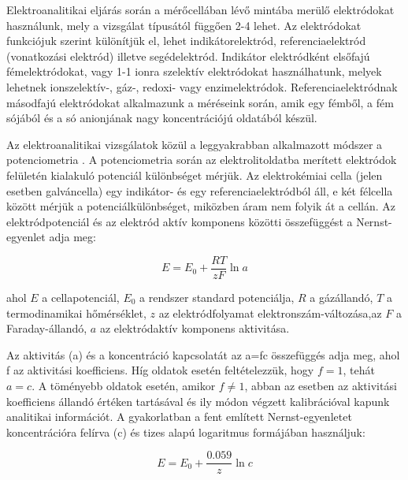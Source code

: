 Elektroanalitikai eljárás során a mérőcellában lévő mintába merülő elektródokat használunk, mely a vizsgálat típusától függően 2-4 lehet. Az elektródokat funkciójuk szerint különítjük el, lehet indikátorelektród, referenciaelektród (vonatkozási elektród) illetve segédelektród. Indikátor elektródként elsőfajú fémelektródokat, vagy 1-1 ionra szelektív elektródokat használhatunk, melyek lehetnek ionszelektív-, gáz-, redoxi- vagy enzimelektródok. Referenciaelektródnak másodfajú elektródokat alkalmazunk a méréseink során, amik egy fémből, a fém sójából és a só anionjának nagy koncentrációjú oldatából készül.

Az elektroanalitikai vizsgálatok közül a leggyakrabban alkalmazott módszer a potenciometria \cite{erdey1967}. A potenciometria során az elektrolitoldatba merített elektródok felületén kialakuló potenciál különbséget mérjük. Az elektrokémiai cella (jelen esetben galváncella) egy indikátor- és egy referenciaelektródból áll, e két félcella között mérjük a potenciálkülönbséget, miközben áram nem folyik át a cellán. Az elektródpotenciál és az elektród aktív komponens közötti összefüggést a Nernst-egyenlet adja meg:

\begin{equation}
E = E_\text{0} + \frac{RT}{zF} \ln a
\end{equation}

ahol $E$ a cellapotenciál, $E_\text{0}$ a rendszer standard potenciálja, $R$ a gázállandó, $T$ a termodinamikai hőmérséklet, $z$ az elektródfolyamat elektronszám-változása,az $F$ a Faraday-állandó, $a$ az elektródaktív komponens aktivitása.

Az aktivitás (a) és a koncentráció kapcsolatát az a=fc összefüggés adja meg, ahol f az aktivitási koefficiens. Híg oldatok esetén feltételezzük, hogy $f=1$, tehát $a=c$. A töményebb oldatok esetén, amikor $f\neq 1$, abban az esetben az aktivitási koefficiens állandó értéken tartásával és ily módon végzett kalibrációval kapunk analitikai információt. A gyakorlatban a fent említett Nernst-egyenletet koncentrációra felírva (c) és tizes alapú logaritmus formájában használjuk:

\begin{equation}
E= E_\text{0} + \frac{0.059}{z} \ln c
\end{equation}

